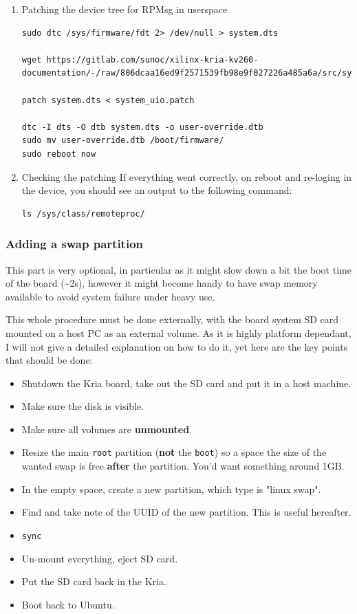 \documentclass[10pt]{article}
\begin{document}
\begin{enumerate}
\item Patching the device tree for RPMsg in userspace
\label{sec:org76e2645}
\begin{verbatim}
sudo dtc /sys/firmware/fdt 2> /dev/null > system.dts

wget https://gitlab.com/sunoc/xilinx-kria-kv260-documentation/-/raw/806dcaa16ed9f2571539fb98e9f027226a485a6a/src/system_uio.patch

patch system.dts < system_uio.patch

dtc -I dts -O dtb system.dts -o user-override.dtb
sudo mv user-override.dtb /boot/firmware/
sudo reboot now
\end{verbatim}

\item Checking the patching
\label{sec:orgd850791}
If everything went correctly, on reboot and re-loging in the device, you should
see an output to the following command:
\begin{verbatim}
ls /sys/class/remoteproc/
\end{verbatim}
\end{enumerate}

\subsubsection{Adding a swap partition}
\label{sec:org24c6401}
This part is very optional, in particular as it might slow down a bit the
boot time of the board (\textasciitilde{}2s), however it might become handy to have swap memory
available to avoid system failure under heavy use.

This whole procedure must be done externally, with the board system SD card
mounted on a host PC as an external volume.  As it is highly platform dependant,
I will not give a detailed explanation on how to do it, yet here are the key
points that should be done:
\begin{itemize}
\item Shutdown the Kria board, take out the SD card and put it in a host machine.
\item Make sure the disk is visible.
\item Make sure all volumes are \textbf{unmounted}.
\item Resize the main \texttt{root} partition (\textbf{not} the \texttt{boot}) so a space the size of the
wanted swap is free \textbf{after} the partition. You'd want something around 1GB.
\item In the empty space, create a new partition, which type is "linux swap".
\item Find and take note of the UUID of the new partition. This is useful hereafter.
\item \texttt{sync}
\item Un-mount everything, eject SD card.
\item Put the SD card back in the Kria.
\item Boot back to Ubuntu.
\end{itemize}
\end{document}
